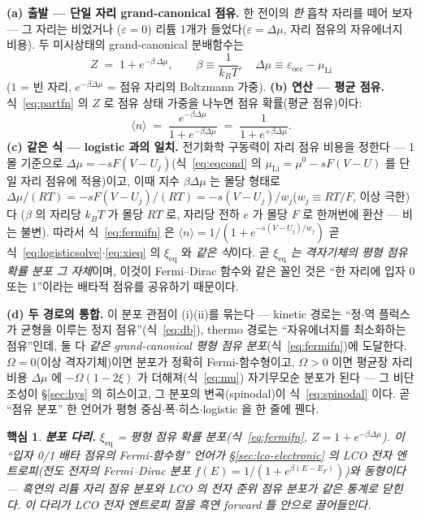 \documentclass[11pt,a4paper]{article}
\newtheorem*{keybox}{핵심}
\newcommand{\eq}{\mathrm{eq}}
\begin{document}
\textbf{(a) 출발 — 단일 자리 grand-canonical 점유.} 한 전이의 \emph{한} 흡착 자리를 떼어 보자 — 그 자리는 비었거나
($\varepsilon=0$) 리튬 1개가 들었다($\varepsilon=\Delta\mu$, 자리 점유의 자유에너지 비용). 두 미시상태의
grand-canonical 분배함수는
\begin{equation}
Z\;=\;1+e^{-\beta\,\Delta\mu},\qquad \beta\equiv\frac{1}{k_BT},\quad
\Delta\mu\equiv\varepsilon_\mathrm{occ}-\mu_\mathrm{Li}
\label{eq:partfn}
\end{equation}
($1$ = 빈 자리, $e^{-\beta\Delta\mu}$ = 점유 자리의 Boltzmann 가중). \textbf{(b) 연산 — 평균 점유.} 식~\eqref{eq:partfn}
의 $Z$ 로 점유 상태 가중을 나누면 점유 확률(평균 점유)이다:
\begin{equation}
\langle n\rangle\;=\;\frac{e^{-\beta\Delta\mu}}{1+e^{-\beta\Delta\mu}}
\;=\;\frac{1}{1+e^{+\beta\Delta\mu}}.
\label{eq:fermifn}
\end{equation}
\textbf{(c) 같은 식 — logistic 과의 일치.} 전기화학 구동력이 자리 점유 비용을 정한다 — 1몰 기준으로
$\Delta\mu=-sF(V-U_j)$(식~\eqref{eq:eqcond} 의 $\mu_\mathrm{Li}=\mu^0-sF(V-U)$ 를 단일 자리 점유에 적용)이고, 이때
지수 $\beta\Delta\mu$ 는 몰당 형태로 $\Delta\mu/(RT)=-sF(V-U_j)/(RT)=-s(V-U_j)/w_j$($w_j\equiv RT/F$, 이상 극한)다
($\beta$ 의 자리당 $k_BT$ 가 몰당 $RT$ 로, 자리당 전하 $e$ 가 몰당 $F$ 로 한꺼번에 환산 — 비는 불변). 따라서
식~\eqref{eq:fermifn} 은 $\langle n\rangle=1/(1+e^{-s(V-U_j)/w_j})$ 곧 식~\eqref{eq:logisticsolve}$\cdot$\eqref{eq:xieq}
의 $\xi_\eq$ 와 \emph{같은 식}이다. 곧 \emph{$\xi_\eq$ 는 격자기체의 평형 점유 확률 분포 그 자체}이며, 이것이
Fermi--Dirac 함수와 같은 꼴인 것은 ``한 자리에 입자 0 또는 1''이라는 배타적 점유를 공유하기 때문이다.

\textbf{(d) 두 경로의 통합.} 이 분포 관점이 (i)(ii)를 묶는다 — kinetic 경로는 ``정$\cdot$역 플럭스가 균형을 이루는 정지
점유''(식~\eqref{eq:db}), thermo 경로는 ``자유에너지를 최소화하는 점유''인데, 둘 다 \emph{같은 grand-canonical 평형
점유 분포}(식~\eqref{eq:fermifn})에 도달한다. $\Omega=0$(이상 격자기체)이면 분포가 정확히 Fermi-함수형이고, $\Omega>0$
이면 평균장 자리 비용 $\Delta\mu$ 에 $-\Omega(1-2\xi)$ 가 더해져(식~\eqref{eq:mu}) 자기무모순 분포가 된다 — 그
비단조성이 \S\ref{sec:hys} 의 히스이고, 그 분포의 변곡(spinodal)이 식~\eqref{eq:spinodal} 이다. 곧 ``점유 분포''
한 언어가 평형 중심$\cdot$폭$\cdot$히스$\cdot$logistic 을 한 줄에 꿴다.

\begin{keybox}
\textbf{분포 다리.} $\xi_\eq$ = 평형 점유 확률 분포(식~\eqref{eq:fermifn}, $Z=1+e^{-\beta\Delta\mu}$). 이 ``입자 0/1
배타 점유의 Fermi-함수형'' 언어가 \S\ref{sec:lco-electronic} 의 LCO \emph{전자} 엔트로피(전도 전자의 Fermi--Dirac
분포 $f(E)=1/(1+e^{\beta(E-E_F)})$)와 동형이다 — 흑연의 \emph{리튬 자리} 점유 분포와 LCO 의 \emph{전자 준위} 점유
분포가 같은 통계로 닫힌다. 이 다리가 LCO 전자 엔트로피 절을 흑연 forward 틀 안으로 끌어들인다.
\end{keybox}
\end{document}
